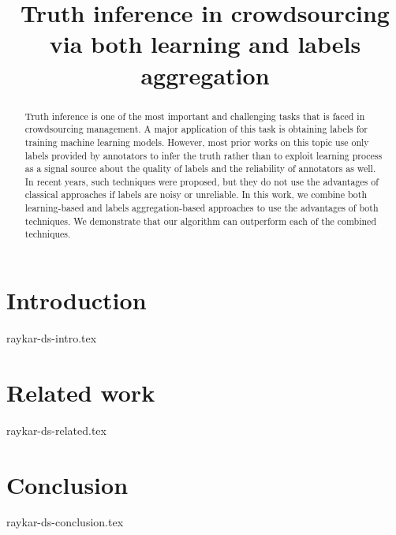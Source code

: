 \documentclass[sigconf]{acmart}
\theoremstyle{remark}
\begin{document}

\title {Truth inference in crowdsourcing via both learning and labels aggregation}




\begin{abstract}
Truth inference is one of the most important and challenging tasks that is faced in crowdsourcing management. A major application of this task is obtaining labels for training machine learning models.  However, most prior works on this topic use only labels provided by annotators to infer the truth rather than to exploit learning process as a signal source about the quality of labels and the reliability of annotators as well. In recent years, such techniques were proposed, but they do not use the advantages of classical approaches if labels are noisy or unreliable. In this work, we combine both learning-based and labels aggregation-based approaches to use the advantages of both techniques. We demonstrate that our algorithm can outperform each of the combined techniques.
\end{abstract}


\maketitle

\thispagestyle{empty}

\section {Introduction}
 {raykar-ds-intro.tex}

\section {Related work}
 {raykar-ds-related.tex}

\section {Conclusion}
 {raykar-ds-conclusion.tex}



\end{document}
